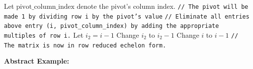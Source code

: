 \documentclass{article}
\begin{document}
\begin{algorithmic}
		\STATE Let \(\text{pivot\_column\_index}\) denote the pivot's column index.
		\STATE \texttt{// The pivot will be made 1 by dividing row i by the pivot's value}
		\STATE \texttt{// Eliminate all entries above entry (i, pivot\_column\_index) by adding the appropriate multiples of row i.}
		\STATE Let \(i_2 = i - 1\)
			\STATE Change \(i_2\) to \(i_2 - 1\)
		\ENDWHILE
	\ENDIF
	\STATE Change \(i\) to \(i - 1\)
\ENDWHILE
\STATE \texttt{// The matrix is now in row reduced echelon form.}
\end{algorithmic}

\vspace{1cm}

\textbf{Abstract Example:}
\end{document}
